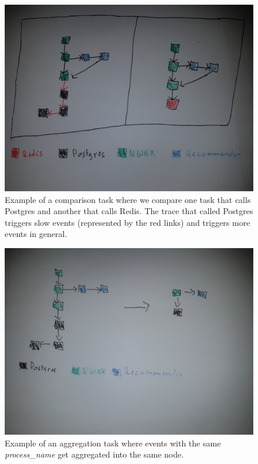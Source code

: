 \begin{figure}
    \includegraphics[width=\linewidth]{comparison.jpg}
    \caption{Example of a comparison task where we compare one task that calls Postgres and another that calls Redis. The trace that
    called Postgres triggers slow events (represented by the red links) and triggers more events in general.}
    \label{fig:comparison}
\end{figure}

\begin{figure}
    \includegraphics[width=\linewidth]{agg.jpg}
    \caption{Example of an aggregation task where events with the same \textit{process\_name} get aggregated into the same node.}
    \label{fig:aggregation}
\end{figure}
